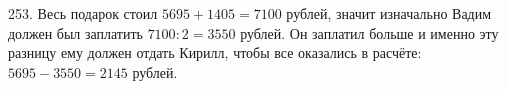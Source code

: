 253. Весь подарок стоил $5695+1405=7100$ рублей, значит изначально Вадим должен был заплатить $7100:2=3550$ рублей. Он заплатил больше и именно эту разницу ему должен отдать Кирилл, чтобы все оказались в расчёте: $5695-3550=2145$ рублей.\\

